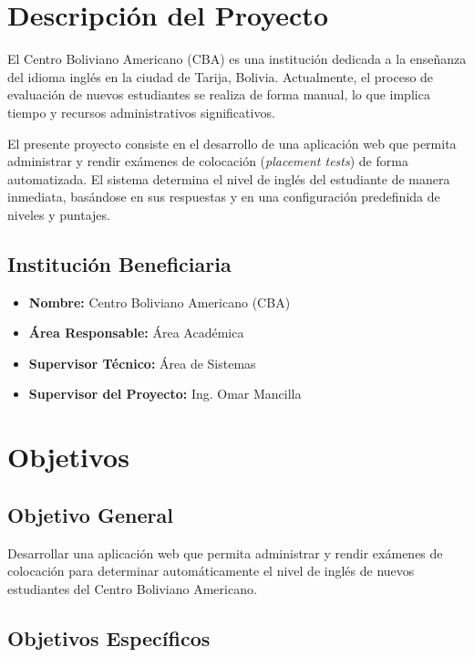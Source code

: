 \section{Descripción del Proyecto}

El Centro Boliviano Americano (CBA) es una institución dedicada a la enseñanza del idioma inglés en la ciudad de Tarija, Bolivia. Actualmente, el proceso de evaluación de nuevos estudiantes se realiza de forma manual, lo que implica tiempo y recursos administrativos significativos.

El presente proyecto consiste en el desarrollo de una aplicación web que permita administrar y rendir exámenes de colocación (\textit{placement tests}) de forma automatizada. El sistema determina el nivel de inglés del estudiante de manera inmediata, basándose en sus respuestas y en una configuración predefinida de niveles y puntajes.

\subsection{Institución Beneficiaria}

\begin{itemize}
    \item \textbf{Nombre:} Centro Boliviano Americano (CBA)
    \item \textbf{Área Responsable:} Área Académica
    \item \textbf{Supervisor Técnico:} Área de Sistemas
    \item \textbf{Supervisor del Proyecto:} Ing. Omar Mancilla
\end{itemize}

\section{Objetivos}

\subsection{Objetivo General}

Desarrollar una aplicación web que permita administrar y rendir exámenes de colocación para determinar automáticamente el nivel de inglés de nuevos estudiantes del Centro Boliviano Americano.

\subsection{Objetivos Específicos}

